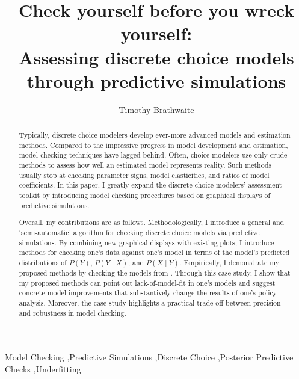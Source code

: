\documentclass[preprint]{elsarticle}
\begin{document}
\begin{frontmatter}

\title{Check yourself before you wreck yourself: \\Assessing discrete choice models through predictive simulations}

\author[tbrathwaite]{Timothy Brathwaite}


\address[tbrathwaite]{Lyft Inc.\\ 185 Berry Street, Suite 5000, San Francisco, CA, 94107}

\begin{abstract}
Typically, discrete choice modelers develop ever-more advanced models and estimation methods. Compared to the impressive progress in model development and estimation, model-checking techniques have lagged behind. Often, choice modelers use only crude methods to assess how well an estimated model represents reality. Such methods usually stop at checking parameter signs, model elasticities, and ratios of model coefficients. In this paper, I greatly expand the discrete choice modelers' assessment toolkit by introducing model checking procedures based on graphical displays of predictive simulations. 

Overall, my contributions are as follows. Methodologically, I introduce a general and `semi-automatic' algorithm for checking discrete choice models via predictive simulations. By combining new graphical displays with existing plots, I introduce methods for checking one's data against one's model in terms of the model's predicted distributions of $P \left( Y \right)$, $P \left( Y \mid X \right)$, and $P \left( X \mid Y \right)$. Empirically, I demonstrate my proposed methods by checking the models from \citet{brownstone_forecasting_1998}. Through this case study, I show that my proposed methods can point out lack-of-model-fit in one's models and suggest concrete model improvements that substantively change the results of one's policy analysis. Moreover, the case study highlights a practical trade-off between precision and robustness in model checking.
\end{abstract}

\begin{keyword}
Model Checking \sep Predictive Simulations \sep Discrete Choice \sep Posterior Predictive Checks \sep Underfitting
\end{keyword}
\end{frontmatter}
\end{document}
